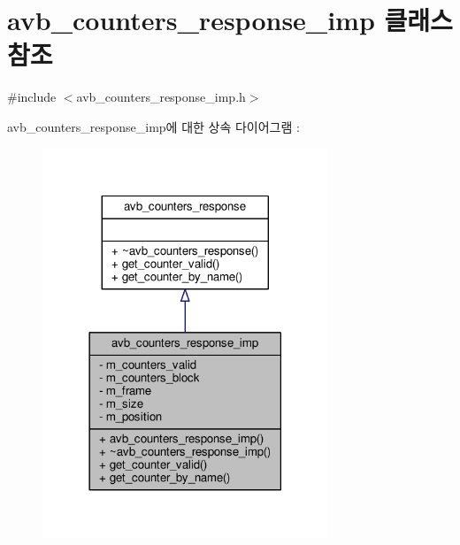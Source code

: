 \hypertarget{classavdecc__lib_1_1avb__counters__response__imp}{}\section{avb\+\_\+counters\+\_\+response\+\_\+imp 클래스 참조}
\label{classavdecc__lib_1_1avb__counters__response__imp}


{\ttfamily \#include $<$avb\+\_\+counters\+\_\+response\+\_\+imp.\+h$>$}



avb\+\_\+counters\+\_\+response\+\_\+imp에 대한 상속 다이어그램 \+: 
\nopagebreak
\begin{figure}[H]
\begin{center}
\leavevmode
\includegraphics[width=242pt]{classavdecc__lib_1_1avb__counters__response__imp__inherit__graph}
\end{center}
\end{figure}


